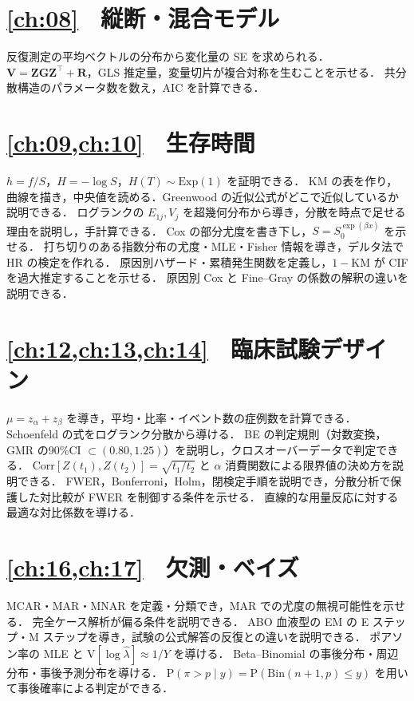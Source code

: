 \documentclass[a4paper,11pt,openany]{ltjsbook}
\newcommand{\V}{\mathrm{V}}
\newcommand{\Corr}{\mathrm{Corr}}
\newcommand{\Prob}{\mathrm{P}}
\newcommand{\Bin}{\mathrm{Bin}}
\newcommand{\Ex}{\mathrm{Exp}}
\newcommand{\transp}{^{\top}}
\begin{document}
\section*{\cref{ch:08}　縦断・混合モデル}
\begin{itemize}
\chk 反復測定の平均ベクトルの分布から変化量の SE を求められる．
\chk $\bm V=\bm Z\bm G\bm Z\transp+\bm R$，GLS 推定量，変量切片が複合対称を生むことを示せる．
\chk 共分散構造のパラメータ数を数え，AIC を計算できる．
\end{itemize}
\section*{\cref{ch:09,ch:10}　生存時間}
\begin{itemize}
\chk $h=f/S$，$H=-\log S$，$H(T)\sim\Ex(1)$ を証明できる．
\chk KM の表を作り，曲線を描き，中央値を読める．Greenwood の近似公式がどこで近似しているか説明できる．
\chk ログランクの $E_{1j},V_j$ を超幾何分布から導き，分散を時点で足せる理由を説明し，手計算できる．
\chk Cox の部分尤度を書き下し，$S=S_0^{\exp(\beta x)}$ を示せる．
\chk 打ち切りのある指数分布の尤度・MLE・Fisher 情報を導き，デルタ法で HR の検定を作れる．
\chk 原因別ハザード・累積発生関数を定義し，$1-$KM が CIF を過大推定することを示せる．
\chk 原因別 Cox と Fine--Gray の係数の解釈の違いを説明できる．
\end{itemize}
\section*{\cref{ch:12,ch:13,ch:14}　臨床試験デザイン}
\begin{itemize}
\chk $\mu=z_\alpha+z_\beta$ を導き，平均・比率・イベント数の症例数を計算できる．
\chk Schoenfeld の式をログランク分散から導ける．
\chk BE の判定規則（対数変換，GMR の90\%CI $\subset(0.80,1.25)$）を説明し，クロスオーバーデータで判定できる．
\chk $\Corr[Z(t_1),Z(t_2)]=\sqrt{t_1/t_2}$ と $\alpha$ 消費関数による限界値の決め方を説明できる．
\chk FWER，Bonferroni，Holm，閉検定手順を説明でき，分散分析で保護した対比較が FWER を制御する条件を示せる．
\chk 直線的な用量反応に対する最適な対比係数を導ける．
\end{itemize}
\section*{\cref{ch:16,ch:17}　欠測・ベイズ}
\begin{itemize}
\chk MCAR・MAR・MNAR を定義・分類でき，MAR での尤度の無視可能性を示せる．
\chk 完全ケース解析が偏る条件を説明できる．
\chk ABO 血液型の EM の E ステップ・M ステップを導き，試験の公式解答の反復との違いを説明できる．
\chk ポアソン率の MLE と $\V[\log\hat\lambda]\approx1/Y$ を導ける．
\chk Beta--Binomial の事後分布・周辺分布・事後予測分布を導ける．
\chk $\Prob(\pi>p\mid y)=\Prob(\Bin(n+1,p)\le y)$ を用いて事後確率による判定ができる．
\end{itemize}
\end{document}
